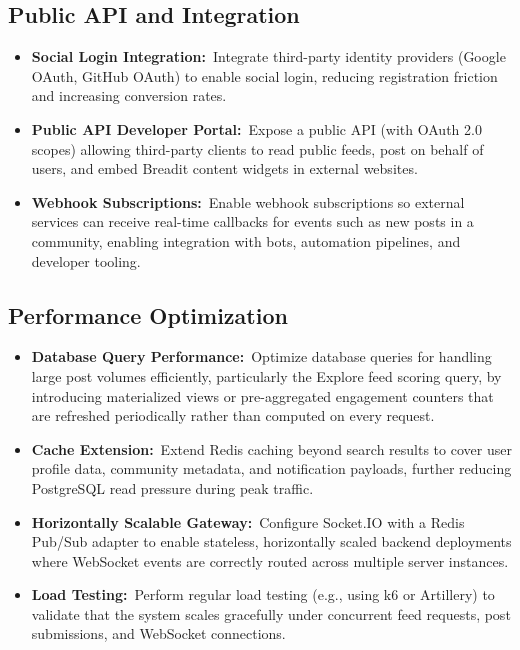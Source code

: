 \subsection{Public API and Integration}
\begin{itemize}
  \item \textbf{Social Login Integration:}~Integrate third-party identity providers (Google OAuth, GitHub OAuth) to enable social login, reducing registration friction and increasing conversion rates.
  \item \textbf{Public API Developer Portal:}~Expose a public API (with OAuth 2.0 scopes) allowing third-party clients to read public feeds, post on behalf of users, and embed Breadit content widgets in external websites.
  \item \textbf{Webhook Subscriptions:}~Enable webhook subscriptions so external services can receive real-time callbacks for events such as new posts in a community, enabling integration with bots, automation pipelines, and developer tooling.
\end{itemize}

\subsection{Performance Optimization}
\begin{itemize}
  \item \textbf{Database Query Performance:}~Optimize database queries for handling large post volumes efficiently, particularly the Explore feed scoring query, by introducing materialized views or pre-aggregated engagement counters that are refreshed periodically rather than computed on every request.
  \item \textbf{Cache Extension:}~Extend Redis caching beyond search results to cover user profile data, community metadata, and notification payloads, further reducing PostgreSQL read pressure during peak traffic.
  \item \textbf{Horizontally Scalable Gateway:}~Configure Socket.IO with a Redis Pub/Sub adapter to enable stateless, horizontally scaled backend deployments where WebSocket events are correctly routed across multiple server instances.
  \item \textbf{Load Testing:}~Perform regular load testing (e.g., using k6 or Artillery) to validate that the system scales gracefully under concurrent feed requests, post submissions, and WebSocket connections.
\end{itemize}

